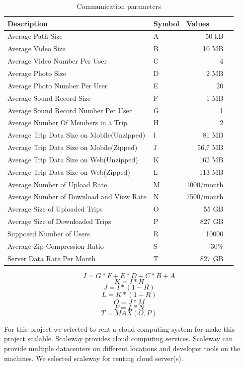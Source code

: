 \newpage
\begin{table}[!ht]
\centering
\caption{Communication parameters}
\label{table:commparameters}
\begin{tabular}{|l|l|r|r|}
\hline
\textbf{Description}                                                                   & \multicolumn{1}{l|}{\textbf{Symbol}} & \multicolumn{1}{l|}{\textbf{Values}} \\ \hline
Average Path Size & A  & 50 kB \\ \hline
Average Video Size & B & 10 MB \\ \hline
Average Video Number Per User & C & 4 \\ \hline
Average Photo Size & D & 2 MB \\ \hline
Average Photo Number Per User & E & 20 \\ \hline
Average Sound Record Size & F & 1 MB \\ \hline
Average Sound Record Number Per User & G & 1 \\ \hline
Average Number Of Members in a Trip & H & 2 \\ \hline
Average Trip Data Size on Mobile(Unzipped) & I & 81 MB \\ \hline
Average Trip Data Size on Mobile(Zipped) & J & 56,7 MB \\ \hline
Average Trip Data Size on Web(Unzipped) & K & 162 MB \\ \hline
Average Trip Data Size on Web(Zipped) & L & 113 MB \\ \hline
Average Number of Upload Rate & M & 1000/month \\ \hline
Average Number of Download and View Rate & N & 7500/month \\ \hline
Average Size of Uploaded Trips & O & 55 GB \\ \hline
Average Size of Downloaded Trips  & P & 827 GB \\ \hline
Supposed Number of Users  & R & 10000 \\ \hline
Average Zip Compression Ratio & S & 30\% \cite{zip} \\ \hline
Server Data Rate Per Month & T & 827 GB \\ \hline
\end{tabular}
\end{table}


\[ I = G * F + E * D + C * B + A \]
\[ K = I * H \]
\[ J = I * (1 - R) \]
\[ L = K * (1 - R) \]
\[ O = J * M \]
\[ P = L * N \]
\[ T = MAX (O, P) \]

For this project we selected to rent a cloud computing system for make this project scalable. Scaleway \cite{scaleway} provides cloud computing services. Scaleway can provide multiple datacenters on different locations and developer tools on the machines. We selected scaleway for renting cloud server(s).

